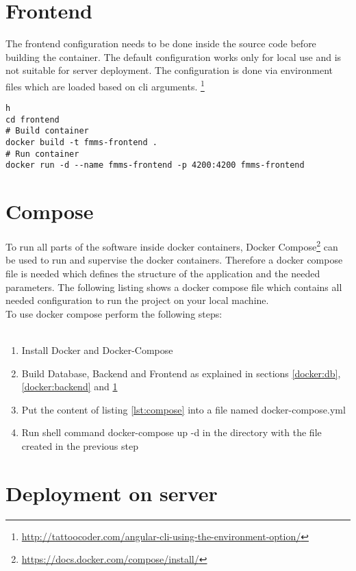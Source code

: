 \section{Frontend}
\label{docker:frontend}

The frontend configuration needs to be done inside the source code before building the container.
The default configuration works only for local use and is not suitable for server deployment.
The configuration is done via environment files which are loaded based on cli arguments. \footnote{\url{http://tattoocoder.com/angular-cli-using-the-environment-option/}}


\begin{minipage}{\textwidth}
\begin{lstlisting}[caption={Build Frontend Container}]h
cd frontend
# Build container
docker build -t fmms-frontend .
# Run container
docker run -d --name fmms-frontend -p 4200:4200 fmms-frontend
\end{lstlisting}
\end{minipage}




\section{Compose}
\label{docker:compose}
To run all parts of the software inside docker containers, Docker Compose\footnote{\url{https://docs.docker.com/compose/install/}} can be used to run and supervise the docker containers.
Therefore a docker compose file is needed which defines the structure of the application and the needed parameters.
The following listing shows a docker compose file which contains all needed configuration to run the project on your local machine.
~\\
To use docker compose perform the following steps: \\ \\
\begin{minipage}{\textwidth}
\begin{enumerate}
	\item Install Docker and Docker-Compose
	\item Build Database, Backend and Frontend as explained in sections \ref{docker:db}, \ref{docker:backend} and \ref{docker:frontend}
	\item Put the content of listing \ref{lst:compose} into a file named \glqq docker-compose.yml\grqq
	\item Run shell command \glqq docker-compose up -d\grqq{} in the directory with the file created in the previous step
\end{enumerate}
\end{minipage}

\begin{minipage}{\textwidth}
	
\end{minipage}


\section{Deployment on server}
\label{docker:deployment}


